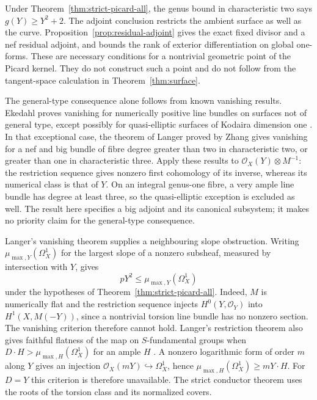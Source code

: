 \documentclass[11pt]{article}
\theoremstyle{remark}\newtheorem{remark}[theorem]{Remark}
\newcommand{\OO}{\mathcal O}
\begin{document}
Under Theorem~\ref{thm:strict-picard-all}, the genus bound in
characteristic two says $g(Y)\geq Y^2+2$.
The adjoint conclusion restricts the ambient surface as well as the
curve. Proposition~\ref{prop:residual-adjoint} gives the exact fixed
divisor and a nef residual adjoint, and bounds the rank of exterior
differentiation on global one-forms. These are necessary conditions
for a nontrivial geometric point of the Picard kernel. They do not
construct such a point and do not follow from the tangent-space
calculation in Theorem~\ref{thm:surface}.

The general-type consequence alone follows from known vanishing
results. Ekedahl proves vanishing for numerically positive line
bundles on surfaces not of general type, except possibly for
quasi-elliptic surfaces of Kodaira dimension one
\cite[II, Theorem~1.6, p.~125]{EkedahlCanonical}.
In that exceptional case, the theorem of Langer proved by Zhang
\cite[Theorem~3.1, author pp.~4--5]{ZhangQuasiElliptic}
gives vanishing for a nef and big bundle of fibre degree greater
than two in characteristic two, or greater than one in characteristic
three. Apply these results to $\OO_X(Y)\otimes M^{-1}$:
the restriction sequence gives nonzero first cohomology of its
inverse, whereas its numerical class is that of $Y$.
On an integral genus-one fibre, a very ample line bundle has degree
at least three, so the quasi-elliptic exception is excluded as well.
The result here specifies a big adjoint and its canonical subsystem;
it makes no priority claim for the general-type consequence.

Langer's vanishing theorem supplies a neighbouring slope obstruction. Writing $\mu_{\max,Y}(\Omega_X^1)$ for the largest slope of a nonzero subsheaf, measured by intersection with $Y$, \cite[Theorem~9.1, pp.~2105--2106]{LangerS} gives
\[
 pY^2\leq\mu_{\max,Y}(\Omega_X^1)
\]
under the hypotheses of Theorem~\ref{thm:strict-picard-all}. Indeed, $M$ is numerically flat and the restriction sequence injects $H^0(Y,\OO_Y)$ into $H^1(X,M(-Y))$, since a nontrivial torsion line bundle has no nonzero section. The vanishing criterion therefore cannot hold. Langer's restriction theorem also gives faithful flatness of the map on $S$-fundamental groups when $D\cdot H>\mu_{\max,H}(\Omega_X^1)$ for an ample $H$ \cite[Theorem~10.2 and proof, pp.~2109--2111]{LangerS}. A nonzero logarithmic form of order $m$ along $Y$ gives an injection $\OO_X(mY)\hookrightarrow\Omega_X^1$, hence $\mu_{\max,H}(\Omega_X^1)\geq mY\cdot H$. For $D=Y$ this criterion is therefore unavailable. The strict conductor theorem uses the roots of the torsion class and its normalized covers.
\end{document}
